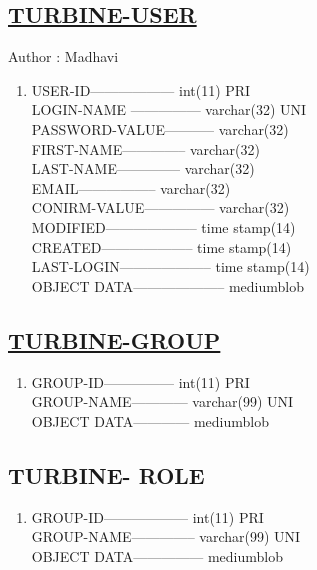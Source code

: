 \documentclass{article}
\begin{document}
\begin{center}
\section*{\underline{TURBINE-USER}}
                          Author : Madhavi
\end{center}
\begin{enumerate}
\item[{}{}]

USER-ID------------------               int(11)                         PRI \\ 
LOGIN-NAME ---------------           varchar(32)                     UNI \\
PASSWORD-VALUE-----------            varchar(32) \\
FIRST-NAME--------------             varchar(32)   \\ 
LAST-NAME--------------              varchar(32) \\
EMAIL-----------------               varchar(32)   \\                           
CONIRM-VALUE---------------          varchar(32) \\
MODIFIED--------------------         time stamp(14)\\ 
CREATED--------------------          time stamp(14) \\
LAST-LOGIN--------------------       time stamp(14) \\
OBJECT DATA--------------------       mediumblob \\
\end{enumerate}
\subsection*{\underline{TURBINE-GROUP}} 
\begin{enumerate} 
\item[{}{}]

GROUP-ID---------------  int(11)                          PRI \\
GROUP-NAME------------   varchar(99)                      UNI \\
OBJECT DATA------------   mediumblob \\
\end{enumerate} 
\subsection*{TURBINE- ROLE} 
\begin{enumerate} 
\item[{}{}]

GROUP-ID------------------           int(11)                       PRI \\
GROUP-NAME--------------            varchar(99)                   UNI \\
OBJECT DATA---------------            mediumblob \\
\end{enumerate}
\end{document}
